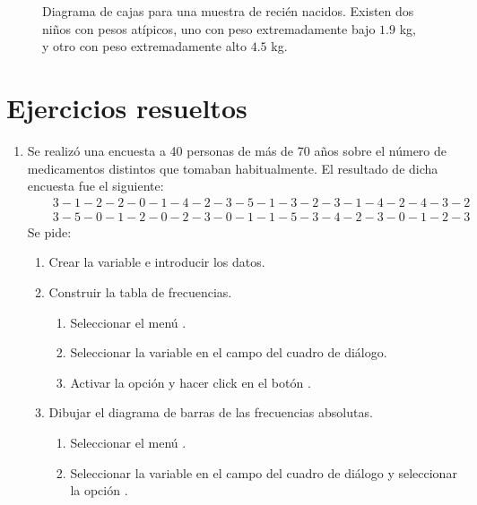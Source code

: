 \begin{figure}[h!]
\begin{center}
\scalebox{0.8}{}
\caption{Diagrama de cajas para una muestra de recién nacidos. Existen dos niños con pesos atípicos, uno con peso extremadamente bajo $1.9$ kg, y otro con peso extremadamente alto $4.5$ kg.}
\label{g:cajas}
\end{center}
\end{figure}

\clearpage
\newpage

\section{Ejercicios resueltos}

\begin{enumerate}[leftmargin=*]
\item  Se realizó una encuesta a 40 personas de más de 70 años sobre el número de medicamentos distintos que tomaban habitualmente. El resultado de dicha encuesta fue el siguiente:
\begin{eqnarray*}
&&3-1-2-2-0-1-4-2-3-5-1-3-2-3-1-4-2-4-3-2 \\
&&3-5-0-1-2-0-2-3-0-1-1-5-3-4-2-3-0-1-2-3
\end{eqnarray*}
Se pide:

\begin{enumerate}
\item  Crear la variable  e introducir los datos.

\item  Construir la tabla de frecuencias.
\begin{indicacion}
\begin{enumerate}
\item Seleccionar el menú . 
\item Seleccionar la variable  en el campo  del cuadro de diálogo. 
\item Activar la opción  y hacer click en el botón .
\end{enumerate}
\end{indicacion}

\item  Dibujar el diagrama de barras de las frecuencias absolutas.
\begin{indicacion}
\begin{enumerate}
\item Seleccionar el menú . 
\item Seleccionar la variable  en el campo  del cuadro de diálogo y seleccionar la opción .
\end{enumerate}
\end{indicacion}


\end{enumerate}
\end{enumerate}
